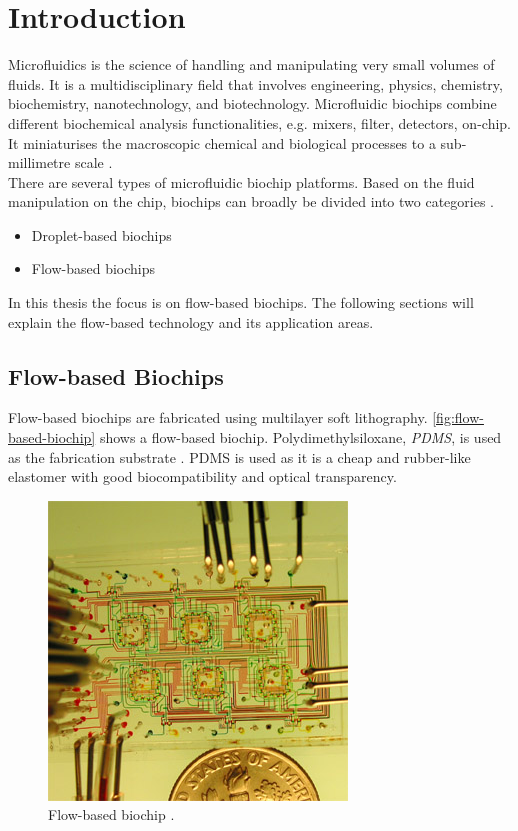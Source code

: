 \chapter{Introduction}
Microfluidics is the science of handling and manipulating very small volumes of fluids. It is a multidisciplinary field that involves engineering, physics, chemistry, biochemistry, nanotechnology, and biotechnology. Microfluidic biochips combine different biochemical analysis functionalities, e.g. mixers, filter, detectors, on-chip. It miniaturises the macroscopic chemical and biological processes to a sub-millimetre scale \cite{microfluidic-largescale}.  
\\
There are several types of microfluidic biochip platforms. Based on the fluid manipulation on the chip, biochips can broadly be divided into two categories \cite{wajid}.
\begin{itemize}
\item Droplet-based biochips
\item Flow-based biochips
\end{itemize}
In this thesis the focus is on flow-based biochips. The following sections will explain the flow-based technology and its application areas.

\section{Flow-based Biochips}
Flow-based biochips are fabricated using multilayer soft lithography. \autoref{fig:flow-based-biochip} shows a flow-based biochip. Polydimethylsiloxane, \emph{PDMS}, is used as the fabrication substrate \cite{integration-microfluidics}. PDMS is used as it is a cheap and rubber-like elastomer with good biocompatibility and optical transparency.
\begin{figure}[H]
\centering
\includegraphics[scale=0.65]{figures/flow-based-biochip.jpg}
\caption[Flow-based biochip]{Flow-based biochip \cite{stanford-group}.}
\label{fig:flow-based-biochip}
\end{figure}

